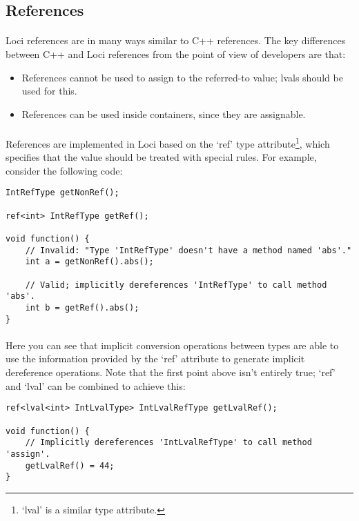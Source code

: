 \documentclass[12pt,twoside,notitlepage]{report}
\begin{document}
\subsection{References}

\paragraph{}
Loci references are in many ways similar to C++ references. The key differences between C++ and Loci references from the point of view of developers are that:

\begin{itemize}
\item References cannot be used to assign to the referred-to value; lvals should be used for this.
\item References can be used inside containers, since they are assignable.
\end{itemize}

\paragraph{}
References are implemented in Loci based on the `ref' type attribute\footnote{`lval' is a similar type attribute.}, which specifies that the value should be treated with special rules. For example, consider the following code:

\begin{lstlisting}
IntRefType getNonRef();

ref<int> IntRefType getRef();

void function() {
	// Invalid: "Type 'IntRefType' doesn't have a method named 'abs'."
	int a = getNonRef().abs();
	
	// Valid; implicitly dereferences 'IntRefType' to call method 'abs'.
	int b = getRef().abs();
}
\end{lstlisting}

\paragraph{}
Here you can see that implicit conversion operations between types are able to use the information provided by the `ref' attribute to generate implicit dereference operations. Note that the first point above isn't entirely true; `ref' and `lval' can be combined to achieve this:

\begin{lstlisting}
ref<lval<int> IntLvalType> IntLvalRefType getLvalRef();

void function() {
	// Implicitly dereferences 'IntLvalRefType' to call method 'assign'.
	getLvalRef() = 44;
}
\end{lstlisting}
\end{document}
